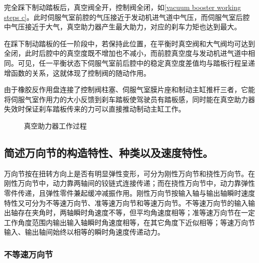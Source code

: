 \documentclass[UTF8]{ctexart}
\numberwithin{figure}{section}
\numberwithin{table}{section}
\begin{document}
完全踩下制动踏板后，真空阀全开，控制阀全闭，如\cref{vacuum booster working steps c}。此时伺服气室前腔的气压接近于发动机进气道中气压，而伺服气室后腔中气压接近于大气，真空助力器产生最大助力，对应的刹车力矩也达到最大。

在踩下制动踏板的任一阶段中，若保持此位置，在平衡时真空阀和大气阀均可达到全闭，此时后腔中的真空度既不增加也不减小，而前腔真空度与发动机进气道中相同。可见，任一平衡状态下伺服气室前后腔中的稳定真空度差值均与踏板行程呈递增函数的关系，这就体现了控制阀的随动作用。

由于橡胶反作用盘连接了控制阀柱塞、伺服气室膜片座和制动主缸推杆三者，它能将伺服气室作用力的大小反馈到刹车踏板使驾驶员有踏板感，同时能在真空助力器失效时保证刹车踏板传来的力可以直接推动制动主缸工作。

\begin{figure}[htbp]
	\centering
	\begin{minipage}[b]{\textwidth}
		\centering
		\caption{真空助力器工作过程}
		\label{vacuum booster working steps}
	\end{minipage}
\end{figure}

\subsection{简述万向节的构造特性、种类以及速度特性。}

万向节按在扭转方向上是否有明显弹性变形，可分为刚性万向节和挠性万向节。在刚性万向节中，动力靠两轴间的铰链式连接传递；而在挠性万向节中，动力靠弹性零件传递，且弹性零件兼起缓冲减振作用。刚性万向节按输入轴与输出轴瞬时速度特性又可分为不等速万向节、准等速万向节和等速万向节。不等速万向节的输入输出轴存在夹角时，两轴瞬时角速度不等，但平均角速度相等；准等速万向节在一定工作角度范围内输出输入轴瞬时角速度相等，在其它角度下近似相等；等速万向节输入、输出轴间始终以相等的瞬时角速度传递动力。

\subsubsection{不等速万向节}
\end{document}
